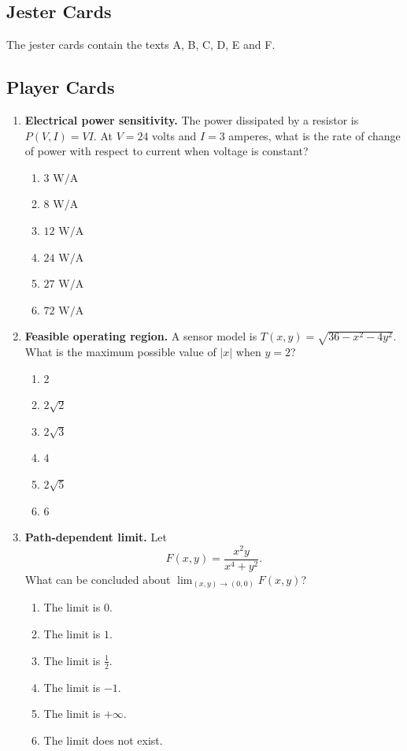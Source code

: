 \documentclass[a4paper,12pt]{article}
\theoremstyle{mystyle}
\numberwithin{equation}{section}
\numberwithin{theorem}{section}
\numberwithin{proposition}{section}
\numberwithin{example}{section}
\numberwithin{remark}{section}
\numberwithin{lemma}{section}
\numberwithin{corollary}{section}
\numberwithin{definition}{section}
\begin{document}
\subsection{Jester Cards}

The jester cards contain the texts A, B, C, D, E and F.

\subsection{Player Cards}

\begin{enumerate}[label=\textbf{Question \arabic*.},leftmargin=*]

\item \textbf{Electrical power sensitivity.} The power dissipated by a resistor is $P(V,I)=VI$. At $V=24$ volts and $I=3$ amperes, what is the rate of change of power with respect to current when voltage is constant?
\begin{enumerate}[label=(\Alph*)]
\item $3\text{ W/A}$
\item $8\text{ W/A}$
\item $12\text{ W/A}$
\item $24\text{ W/A}$
\item $27\text{ W/A}$
\item $72\text{ W/A}$
\end{enumerate}

\item \textbf{Feasible operating region.} A sensor model is $T(x,y)=\sqrt{36-x^2-4y^2}$. What is the maximum possible value of $|x|$ when $y=2$?
\begin{enumerate}[label=(\Alph*)]
\item $2$
\item $2\sqrt2$
\item $2\sqrt3$
\item $4$
\item $2\sqrt5$
\item $6$
\end{enumerate}

\item \textbf{Path-dependent limit.} Let
\[
F(x,y)=\frac{x^2y}{x^4+y^2}.
\]
What can be concluded about $\displaystyle\lim_{(x,y)\to(0,0)}F(x,y)$?
\begin{enumerate}[label=(\Alph*)]
\item The limit is $0$.
\item The limit is $1$.
\item The limit is $\frac12$.
\item The limit is $-1$.
\item The limit is $+\infty$.
\item The limit does not exist.
\end{enumerate}


\end{enumerate}
\end{document}

